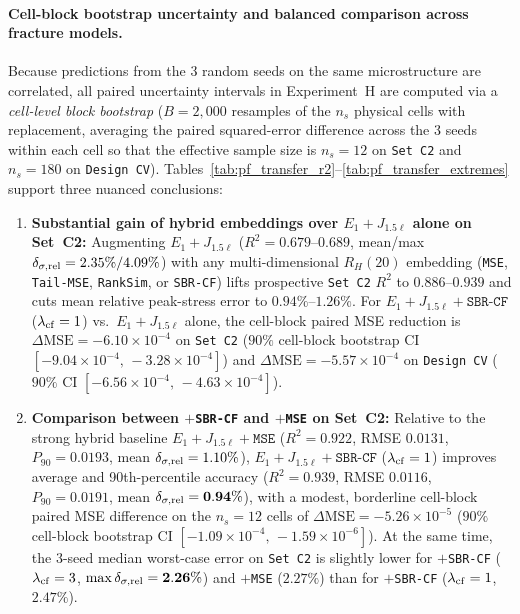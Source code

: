 \documentclass[preprint,11pt,a4paper]{elsarticle}
\begin{document}
\paragraph{Cell-block bootstrap uncertainty and balanced comparison across fracture models.}
Because predictions from the 3 random seeds on the same microstructure are correlated, all paired uncertainty intervals in Experiment~H are computed via a \emph{cell-level block bootstrap} ($B=2{,}000$ resamples of the $n_s$ physical cells with replacement, averaging the paired squared-error difference across the 3 seeds within each cell so that the effective sample size is $n_s=12$ on \texttt{Set C2} and $n_s=180$ on \texttt{Design CV}). Tables~\ref{tab:pf_transfer_r2}--\ref{tab:pf_transfer_extremes} support three nuanced conclusions:
\begin{enumerate}
    \item \textbf{Substantial gain of hybrid embeddings over $E_1+J_{1.5\ell}$ alone on Set~C2:} Augmenting $E_1+J_{1.5\ell}$ ($R^2=0.679\text{--}0.689$, mean/max $\delta_{\sigma,\rm rel}=2.35\%/4.09\%$) with any multi-dimensional $R_H(20)$ embedding (\texttt{MSE}, \texttt{Tail-MSE}, \texttt{RankSim}, or \texttt{SBR-CF}) lifts prospective \texttt{Set C2} $R^2$ to $0.886\text{--}0.939$ and cuts mean relative peak-stress error to $0.94\%\text{--}1.26\%$. For $E_1+J_{1.5\ell}+\texttt{SBR-CF}$ ($\lambda_{\rm cf}=1$) vs.\ $E_1+J_{1.5\ell}$ alone, the cell-block paired MSE reduction is $\Delta\text{MSE}=-6.10\times 10^{-4}$ on \texttt{Set C2} ($90\%$ cell-block bootstrap CI $[-9.04\times 10^{-4},\,-3.28\times 10^{-4}]$) and $\Delta\text{MSE}=-5.57\times 10^{-4}$ on \texttt{Design CV} ($90\%$ CI $[-6.56\times 10^{-4},\,-4.63\times 10^{-4}]$).
    \item \textbf{Comparison between $+$\texttt{SBR-CF} and $+$\texttt{MSE} on Set~C2:} Relative to the strong hybrid baseline $E_1+J_{1.5\ell}+\texttt{MSE}$ ($R^2=0.922$, RMSE $0.0131$, $P_{90}=0.0193$, mean $\delta_{\sigma,\rm rel}=1.10\%$), $E_1+J_{1.5\ell}+\texttt{SBR-CF}$ ($\lambda_{\rm cf}=1$) improves average and 90th-percentile accuracy ($R^2=\mathbf{0.939}$, RMSE $\mathbf{0.0116}$, $P_{90}=\mathbf{0.0191}$, mean $\delta_{\sigma,\rm rel}=\mathbf{0.94\%}$), with a modest, borderline cell-block paired MSE difference on the $n_s=12$ cells of $\Delta\text{MSE}=-5.26\times 10^{-5}$ ($90\%$ cell-block bootstrap CI $[-1.09\times 10^{-4},\,-1.59\times 10^{-6}]$). At the same time, the 3-seed median worst-case error on \texttt{Set C2} is slightly lower for $+$\texttt{SBR-CF} ($\lambda_{\rm cf}=3$, $\max\delta_{\sigma,\rm rel}=\mathbf{2.26\%}$) and $+$\texttt{MSE} ($2.27\%$) than for $+$\texttt{SBR-CF} ($\lambda_{\rm cf}=1$, $2.47\%$).

\end{enumerate}
\end{document}
